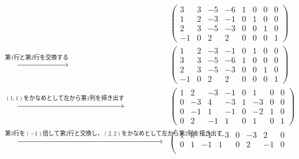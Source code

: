 \documentclass[a4paper,10pt,fleqn]{ltjsarticle}
\begin{document}
\begin{leftbar}
    \begin{align*}
                                                                                &
        \left(
        \begin{array}{cccc|cccc}
                3  & 3 & -5 & -6 & 1 & 0 & 0 & 0 \\
                1  & 2 & -3 & -1 & 0 & 1 & 0 & 0 \\
                2  & 3 & -5 & -3 & 0 & 0 & 1 & 0 \\
                -1 & 0 & 2  & 2  & 0 & 0 & 0 & 1
            \end{array}
        \right)                                                                   \\
        \xrightarrow{\text{第$1$行と第$2$行を交換する}}                                   &
        \left( \begin{array}{cccc|cccc}
                       1  & 2 & -3 & -1 & 0 & 1 & 0 & 0 \\
                       3  & 3 & -5 & -6 & 1 & 0 & 0 & 0 \\
                       2  & 3 & -5 & -3 & 0 & 0 & 1 & 0 \\
                       -1 & 0 & 2  & 2  & 0 & 0 & 0 & 1
                   \end{array}
        \right)                                                                   \\
        \xrightarrow{\text{$(1,1)$をかなめとして左から第1列を掃き出す}}                          &
        \left( \begin{array}{cccc|cccc}
                       1 & 2  & -3 & -1 & 0 & 1  & 0 & 0 \\
                       0 & -3 & 4  & -3 & 1 & -3 & 0 & 0 \\
                       0 & -1 & 1  & -1 & 0 & -2 & 1 & 0 \\
                       0 & 2  & -1 & 1  & 0 & 1  & 0 & 1
                   \end{array}
        \right)                                                                   \\
        \xrightarrow{\text{第$3$行を$(-1)$倍して第2行と交換し，$(2,2)$をかなめとして左から第$2$列を掃き出す}} &
        \left( \begin{array}{cccc|cccc}
                       1 & 0 & -1 & -3 & 0 & -3 & 2  & 0 \\
                       0 & 1 & -1 & 1  & 0 & 2  & -1 & 0 \\

\end{array}
\end{align*}
\end{leftbar}
\end{document}
